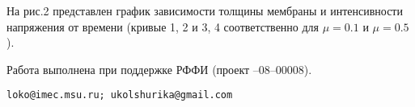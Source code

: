 \documentclass[a4paper,12pt, openany]{memoir}
\numberwithin{equation}{chapter}
\numberwithin{figure}{chapter}
\begin{document}
  На рис.2 представлен график зависимости толщины мембраны и интенсивности напряжения от времени
    (кривые 1, 2 и 3, 4 соответственно для $\mu=0.1$ и $\mu=0.5$).

\smallskip
Работа выполнена при поддержке РФФИ (проект --08--00008).

\begin{verbatim}
loko@imec.msu.ru; ukolshurika@gmail.com
\end{verbatim}	











%
%
\end{document}
